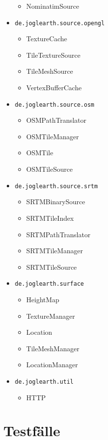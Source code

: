 \documentclass[10pt]{scrreprt}
\begin{document}
\begin{itemize}
\begin{itemize}
 \item NominatimSource
 \end{itemize}
 \item \texttt{de.joglearth.source.opengl}
 \begin{itemize}
 \item TextureCache
 \item TileTextureSource
 \item TileMeshSource
 \item VertexBufferCache
 \end{itemize}
 \item \texttt{de.joglearth.source.osm}
 \begin{itemize}
 \item OSMPathTranslator
 \item OSMTileManager
 \item OSMTile
 \item OSMTileSource
 \end{itemize}
 \item \texttt{de.joglearth.source.srtm}
 \begin{itemize}
 \item SRTMBinarySource
 \item SRTMTileIndex
 \item SRTMPathTranslator
 \item SRTMTileManager
 \item SRTMTileSource
 \end{itemize}
 \item \texttt{de.joglearth.surface}
 \begin{itemize}
 \item HeightMap
 \item TextureManager
 \item Location
 \item TileMeshManager
 \item LocationManager
 \end{itemize}
 \item \texttt{de.joglearth.util}
 \begin{itemize}
 \item HTTP
 \end{itemize}
\end{itemize}

\newpage
\section{Testfälle}
\end{document}
